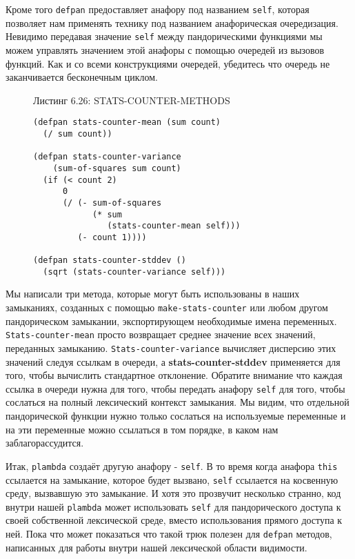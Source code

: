 Кроме того \verb"defpan" предоставляет анафору под названием \verb"self", которая позволяет нам применять технику под названием анафорическая очередизация. Невидимо передавая значение \verb"self" между пандорическими функциями мы можем управлять значением этой анафоры с помощью очередей из вызовов функций. Как и со всеми конструкциями очередей, убедитесь что очередь не заканчивается бесконечным циклом.

\begin{figure}Листинг 6.26: STATS-COUNTER-METHODS\label{listing_6.26}
\listbegin
\begin{verbatim}
(defpan stats-counter-mean (sum count)
  (/ sum count))

(defpan stats-counter-variance
    (sum-of-squares sum count)
  (if (< count 2)
      0
      (/ (- sum-of-squares
            (* sum
               (stats-counter-mean self)))
         (- count 1))))

(defpan stats-counter-stddev ()
  (sqrt (stats-counter-variance self)))
\end{verbatim}
\listend
\end{figure}

Мы написали три метода, которые могут быть использованы в наших замыканиях, созданных с помощью \verb"make-stats-counter" или любом другом пандорическом замыкании, экспортирующем необходимые имена переменных. \verb"Stats-counter-mean" просто возвращает среднее значение всех значений, переданных замыканию. \verb"Stats-counter-variance" вычисляет дисперсию этих значений следуя ссылкам в очереди, а {\Eng\textbf{stats-counter-stddev}} применяется для того, чтобы вычислить стандартное отклонение. Обратите внимание что каждая ссылка в очереди нужна для того, чтобы передать анафору \verb"self" для того, чтобы сослаться на полный лексический контекст замыкания. Мы видим, что отдельной пандорической функции нужно только сослаться на используемые переменные и на эти переменные можно ссылаться в том порядке, в каком нам заблагорассудится.

Итак, \verb"plambda" создаёт другую анафору - \verb"self". В то время когда анафора \verb"this" ссылается на замыкание, которое будет вызвано, \verb"self" ссылается на косвенную среду, вызвавшую это замыкание. И хотя это прозвучит несколько странно, код внутри нашей \verb"plambda" может использовать \verb"self" для пандорического доступа к своей собственной лексической среде, вместо использования прямого доступа к ней. Пока что может показаться что такой трюк полезен для \verb"defpan" методов, написанных для работы внутри нашей лексической области видимости.

